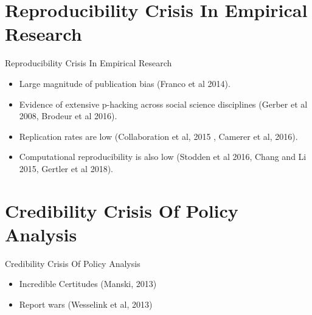\documentclass{beamer}
\begin{document}
\section[Crisis in Research]{Reproducibility Crisis In Empirical Research}

\begin{frame}{Reproducibility Crisis In Empirical Research}

\begin{itemize}
\item Large magnitude of publication bias (Franco et al 2014).  
\item Evidence of extensive p-hacking across social science disciplines (Gerber et al 2008, Brodeur et al 2016).
\item Replication rates are low (Collaboration et al, 2015 , Camerer et al, 2016). 
\item Computational reproducibility is also low (Stodden et al 2016, Chang and Li 2015, Gertler et al 2018).
\end{itemize}

\end{frame} 


\section[Crisis in PA]{Credibility Crisis Of Policy Analysis}

\begin{frame}{Credibility Crisis Of Policy Analysis}
\begin{itemize}
\item Incredible Certitudes  (Manski, 2013) 
\item Report wars (Wesselink et al, 2013) 
\end{itemize}
\end{frame} 
\end{document}
